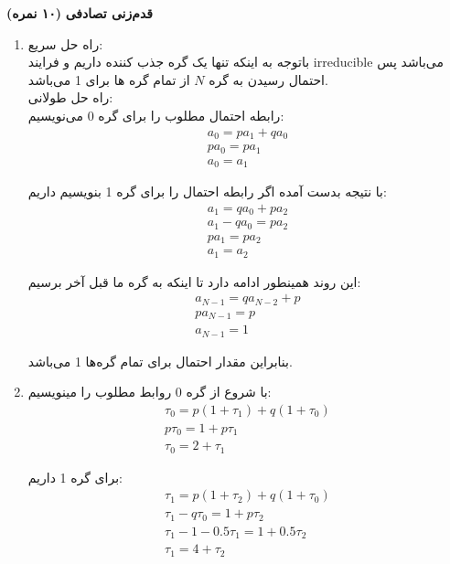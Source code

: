 \Large \textbf{قدم‌زنی تصادفی}
\large \textbf{(۱۰ نمره)}

\normalsize \vspace{0.5cm}

\begin{enumerate}[label=(\alph*)]
	\item
	راه حل سریع:\\
	
	باتوجه به اینکه تنها یک گره جذب کننده داریم و فرایند irreducible می‌باشد پس احتمال رسیدن به گره $N$ از تمام گره ها برای 1 می‌باشد.\\
	
	
	راه حل طولانی:\\
	
	رابطه احتمال مطلوب را برای گره 0 می‌نویسیم:
	$$
	\begin{array}{c}
		{a_0} = p{a_1} + q{a_0}\\
		p{a_0} = p{a_1}\\
		{a_0} = {a_1}
	\end{array}
	$$
	
	با نتیجه بدست آمده اگر رابطه احتمال را برای گره 1 بنویسیم داریم:
	$$
	\begin{array}{c}
		{a_1} = q{a_0} + p{a_2}\\
		{a_1} - q{a_0} = p{a_2}\\
		p{a_1} = p{a_2}\\
		{a_1} = {a_2}
	\end{array}
	$$
	
	این روند همینطور ادامه دارد تا اینکه به گره ما قبل آخر برسیم:
	$$
	\begin{array}{c}
		{a_{N - 1}} = q{a_{N - 2}} + p\\
		p{a_{N - 1}} = p\\
		{a_{N - 1}} = 1
	\end{array}
	$$
	
	بنابراین مقدار احتمال برای تمام گره‌ها 1 می‌باشد.
	
	\item
	
	با شروع از گره 0 روابط مطلوب را مینویسیم:
	$$
	\begin{array}{c}
		{\tau _0} = p(1 + {\tau _1}) + q(1 + {\tau _0})\\
		p{\tau _0} = 1 + p{\tau _1}\\
		{\tau _0} = 2 + {\tau _1}
	\end{array}
	$$
	
	‌برای گره 1 داریم:
	$$
	\begin{array}{c}
		{\tau _1} = p(1 + {\tau _2}) + q(1 + {\tau _0})\\
		{\tau _1} - q{\tau _0} = 1 + p{\tau _2}\\
		{\tau _1} - 1 - 0.5{\tau _1} = 1 + 0.5{\tau _2}\\
		{\tau _1} = 4 + {\tau _2}
	\end{array}
	$$
	

\end{enumerate}
